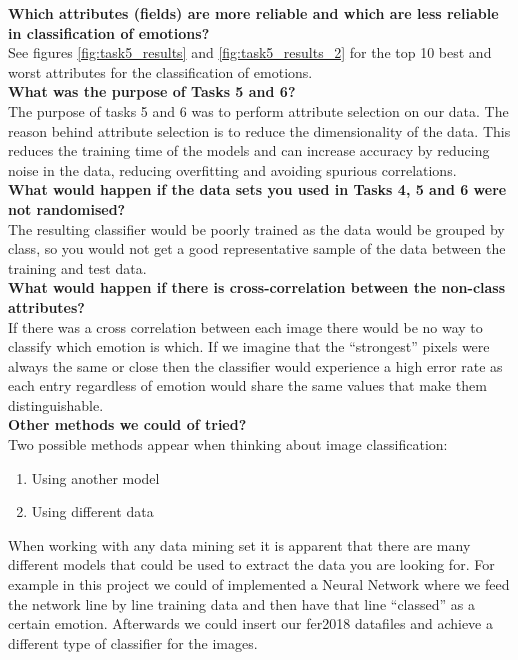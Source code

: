 \documentclass[12pt]{article}
\begin{document}
\noindent\textbf{Which attributes (fields) are more reliable and which are less reliable in classification of emotions?}\\

See figures \ref{fig:task5_results} and \ref{fig:task5_results_2} for the top 10 best and worst attributes for the classification of emotions.\\

\noindent\textbf{What was the purpose of Tasks 5 and 6?}\\

The purpose of tasks 5 and 6 was to perform attribute selection on our data. The reason behind attribute selection is to reduce the dimensionality of the data. This reduces the training time of the models and can increase accuracy by reducing noise in the data, reducing overfitting and avoiding spurious correlations.\cite{sain2010}\\

\textbf{What would happen if the data sets you used in Tasks 4, 5 and 6 were not randomised?}\\

The resulting classifier would be poorly trained as the data would be grouped by class, so you would not get a good representative sample of the data between the training and test data.\\

\textbf{What would happen if there is cross-correlation between the non-class attributes? }\\

If there was a cross correlation between each image there would be no way to classify which emotion is which. If we imagine that the “strongest” pixels were always the same or close then the classifier would experience a high error rate as each entry regardless of emotion would share the same values that make them distinguishable.\\ 


\textbf{Other methods we could of tried? }\\

Two possible methods appear when thinking about image classification:

\begin{enumerate}
	\item Using another model
	\item Using different data
\end{enumerate}

When working with any data mining set it is apparent that there are many different models that could be used to extract the data you are looking for. For example in this project we could of implemented a Neural Network where we feed the network line by line training data and then have that line “classed” as a certain emotion. Afterwards we could insert our fer2018 datafiles and achieve a different type of classifier for the images.\\
\end{document}
